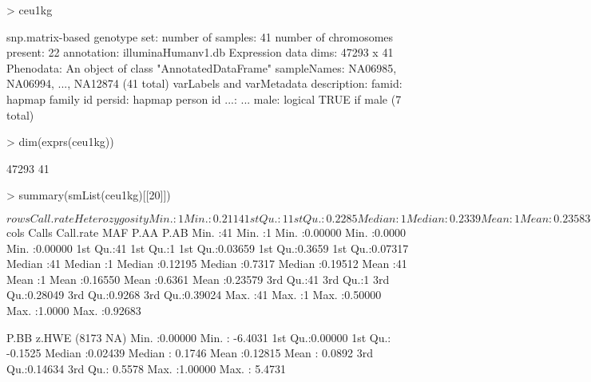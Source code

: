 \clearpage

\begin{Schunk}
\begin{Sinput}
> ceu1kg
\end{Sinput}
\begin{Soutput}
snp.matrix-based genotype set:
number of samples:  41 
number of chromosomes present:  22 
annotation: illuminaHumanv1.db 
Expression data dims: 47293 x 41 
Phenodata: An object of class "AnnotatedDataFrame"
  sampleNames: NA06985, NA06994, ..., NA12874  (41 total)
  varLabels and varMetadata description:
    famid: hapmap family id
    persid: hapmap person id
    ...: ...
    male: logical TRUE if male
    (7 total)
\end{Soutput}
\begin{Sinput}
> dim(exprs(ceu1kg))
\end{Sinput}
\begin{Soutput}
[1] 47293    41
\end{Soutput}
\end{Schunk}

\clearpage

\begin{Schunk}
\begin{Sinput}
> summary(smList(ceu1kg)[[20]])
\end{Sinput}
{\Large
\begin{Soutput}
$rows
   Call.rate Heterozygosity  
 Min.   :1   Min.   :0.2114  
 1st Qu.:1   1st Qu.:0.2285  
 Median :1   Median :0.2339  
 Mean   :1   Mean   :0.2358  
 3rd Qu.:1   3rd Qu.:0.2430  
 Max.   :1   Max.   :0.2555  

$cols
     Calls      Call.rate      MAF               P.AA             P.AB        
 Min.   :41   Min.   :1   Min.   :0.00000   Min.   :0.0000   Min.   :0.00000  
 1st Qu.:41   1st Qu.:1   1st Qu.:0.03659   1st Qu.:0.3659   1st Qu.:0.07317  
 Median :41   Median :1   Median :0.12195   Median :0.7317   Median :0.19512  
 Mean   :41   Mean   :1   Mean   :0.16550   Mean   :0.6361   Mean   :0.23579  
 3rd Qu.:41   3rd Qu.:1   3rd Qu.:0.28049   3rd Qu.:0.9268   3rd Qu.:0.39024  
 Max.   :41   Max.   :1   Max.   :0.50000   Max.   :1.0000   Max.   :0.92683  
                                                                              
      P.BB             z.HWE  (8173 NA)
 Min.   :0.00000   Min.   :  -6.4031  
 1st Qu.:0.00000   1st Qu.:  -0.1525  
 Median :0.02439   Median :   0.1746  
 Mean   :0.12815   Mean   :   0.0892  
 3rd Qu.:0.14634   3rd Qu.:   0.5578  
 Max.   :1.00000   Max.   :   5.4731  
\end{Soutput}
}
\end{Schunk}

